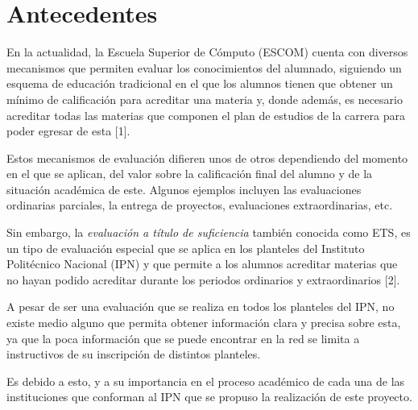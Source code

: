 
\section{Antecedentes}

En la actualidad, la Escuela Superior de Cómputo (ESCOM) cuenta con diversos mecanismos que permiten evaluar los conocimientos del alumnado, siguiendo un esquema de educación tradicional en el que los alumnos tienen que obtener un mínimo de calificación para acreditar una materia y, donde además, es necesario acreditar todas las materias que componen el plan de estudios de la carrera para poder egresar de esta [1].

Estos mecanismos de evaluación difieren unos de otros dependiendo del momento en el que se aplican, del valor sobre la calificación final del alumno y de la situación académica de este. Algunos ejemplos incluyen las evaluaciones ordinarias parciales, la entrega de proyectos, evaluaciones extraordinarias, etc.

Sin embargo, la \textit{evaluación a título de suficiencia} también conocida como ETS, es un tipo de evaluación especial que se aplica en los planteles del Instituto Politécnico Nacional (IPN) y que permite a los alumnos acreditar materias que no hayan podido acreditar durante los periodos ordinarios y extraordinarios [2].

A pesar de ser una evaluación que se realiza en todos los planteles del IPN, no existe medio alguno que permita obtener información clara y precisa sobre esta, ya que la poca información que se puede encontrar en la red se limita a instructivos de su inscripción de distintos planteles.

Es debido a esto, y a su importancia en el proceso académico de cada una de las instituciones que conforman al IPN que se propuso la realización de este proyecto.

 